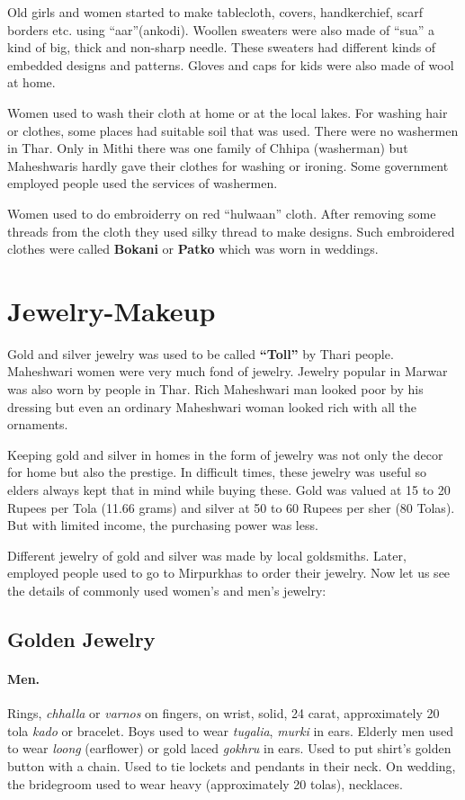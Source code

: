 Old girls and women started to make tablecloth, covers, handkerchief, scarf
borders etc. using ``aar''(ankodi). Woollen sweaters were also made of ``sua'' a
kind of big, thick and non-sharp needle. These sweaters had different kinds of
embedded designs and patterns. Gloves and caps for kids were also made of wool
at home.

Women used to wash their cloth at home or at the local lakes. For washing hair
or clothes, some places had suitable soil that was used. There were no washermen
in Thar. Only in Mithi there was one family of Chhipa (washerman) but
Maheshwaris hardly gave their clothes for washing or ironing. Some government
employed people used the services of washermen.

Women used to do embroiderry on red ``hulwaan'' cloth. After removing some
threads from the cloth they used silky thread to make designs. Such embroidered
clothes were called \textbf{Bokani} or \textbf{Patko} which was worn in
weddings.
\section{Jewelry-Makeup} Gold and silver jewelry was used to be called
\textbf{``Toll''} by Thari people. Maheshwari women were very much fond of
jewelry. Jewelry popular in Marwar was also worn by people in Thar. Rich
Maheshwari man looked poor by his dressing but even an ordinary Maheshwari woman
looked rich with all the ornaments.

Keeping gold and silver in homes in the form of jewelry was not only the decor
for home but also the prestige. In difficult times, these jewelry was useful so
elders always kept that in mind while buying these. Gold was valued at 15 to
20 Rupees per Tola (11.66 grams) and silver at 50 to 60 Rupees per sher (80
Tolas). But with limited income, the purchasing power was less.

Different jewelry of gold and silver was made by local goldsmiths. Later,
employed people used to go to Mirpurkhas to order their jewelry. Now let us see
the details of commonly used women's and men's jewelry:
\subsection{Golden Jewelry}
\paragraph{Men.} Rings, \textit{chhalla} or \textit{varnos} on fingers, on
wrist, solid, 24 carat, approximately 20 tola \textit{kado} or bracelet. Boys
used to wear \textit{tugalia}, \textit{murki} in ears. Elderly men used to wear
\textit{loong} (earflower) or gold laced \textit{gokhru} in ears. Used to put
shirt's golden button with a chain. Used to tie lockets and pendants in their
neck. On wedding, the bridegroom used to wear heavy (approximately 20 tolas),
necklaces.
